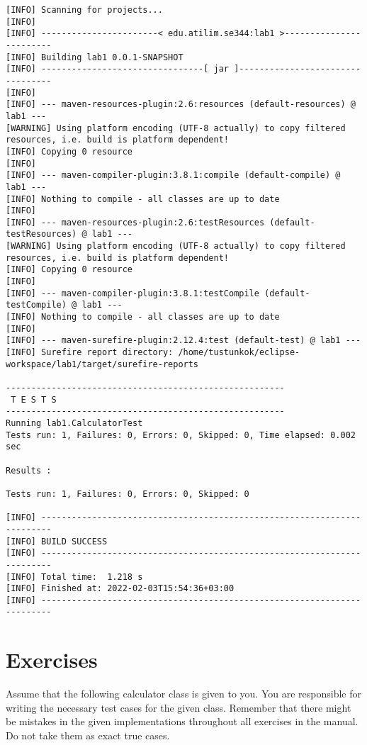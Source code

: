 \begin{lstlisting}[language={},caption={A log output from a Maven test run.}]
[INFO] Scanning for projects...
[INFO] 
[INFO] -----------------------< edu.atilim.se344:lab1 >------------------------
[INFO] Building lab1 0.0.1-SNAPSHOT
[INFO] --------------------------------[ jar ]---------------------------------
[INFO] 
[INFO] --- maven-resources-plugin:2.6:resources (default-resources) @ lab1 ---
[WARNING] Using platform encoding (UTF-8 actually) to copy filtered resources, i.e. build is platform dependent!
[INFO] Copying 0 resource
[INFO] 
[INFO] --- maven-compiler-plugin:3.8.1:compile (default-compile) @ lab1 ---
[INFO] Nothing to compile - all classes are up to date
[INFO] 
[INFO] --- maven-resources-plugin:2.6:testResources (default-testResources) @ lab1 ---
[WARNING] Using platform encoding (UTF-8 actually) to copy filtered resources, i.e. build is platform dependent!
[INFO] Copying 0 resource
[INFO] 
[INFO] --- maven-compiler-plugin:3.8.1:testCompile (default-testCompile) @ lab1 ---
[INFO] Nothing to compile - all classes are up to date
[INFO] 
[INFO] --- maven-surefire-plugin:2.12.4:test (default-test) @ lab1 ---
[INFO] Surefire report directory: /home/tustunkok/eclipse-workspace/lab1/target/surefire-reports

-------------------------------------------------------
 T E S T S
-------------------------------------------------------
Running lab1.CalculatorTest
Tests run: 1, Failures: 0, Errors: 0, Skipped: 0, Time elapsed: 0.002 sec

Results :

Tests run: 1, Failures: 0, Errors: 0, Skipped: 0

[INFO] ------------------------------------------------------------------------
[INFO] BUILD SUCCESS
[INFO] ------------------------------------------------------------------------
[INFO] Total time:  1.218 s
[INFO] Finished at: 2022-02-03T15:54:36+03:00
[INFO] ------------------------------------------------------------------------
\end{lstlisting}

\section{Exercises}
Assume that the following calculator class is given to you. You are responsible for writing the necessary test cases for the given class. Remember that there might be mistakes in the given implementations throughout all exercises in the manual. Do not take them as exact true cases.

